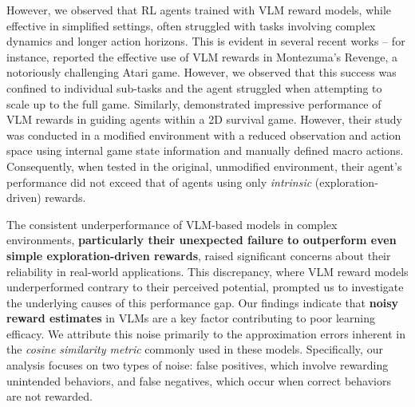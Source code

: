\documentclass{article}
\theoremstyle{plain}
\theoremstyle{definition}
\theoremstyle{remark}
\begin{document}


However, we observed that RL agents trained with VLM reward models, while effective in simplified settings, often struggled with tasks involving complex dynamics and longer action horizons. This is evident in several recent works -- for instance, \citet{Goyal2019UsingNL} reported the effective use of VLM rewards in Montezuma's Revenge, a notoriously challenging Atari game. However, we observed that this success was confined to individual sub-tasks and the agent struggled when attempting to scale up to the full game. Similarly, \citet{du2023guiding} demonstrated impressive performance of VLM rewards in guiding agents within a 2D survival game. However, their study was conducted in a modified environment with a reduced observation and action space using internal game state information and manually defined macro actions. Consequently, when tested in the original, unmodified environment, their agent's performance did not exceed that of agents using only \emph{intrinsic} (exploration-driven) rewards.

The consistent underperformance of VLM-based models in complex environments, \textbf{particularly their unexpected failure to outperform even simple exploration-driven rewards}, raised significant concerns about their reliability in real-world applications. This discrepancy, where VLM reward models underperformed contrary to their perceived potential, prompted us to investigate the underlying causes of this performance gap. Our findings indicate that \textbf{noisy reward estimates} in VLMs are a key factor contributing to poor learning efficacy. We attribute this noise primarily to the approximation errors inherent in the \emph{cosine similarity metric} commonly used in these models. Specifically, our analysis focuses on two types of noise: false positives, which involve rewarding unintended behaviors, and false negatives, which occur when correct behaviors are not rewarded.
\end{document}
